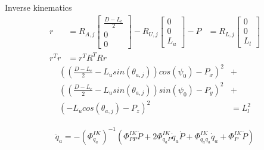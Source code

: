 Inverse kinematics
\begin{equation}
    \begin{aligned}
    r&= R_{A,j}\begin{bmatrix}\frac{D-L_e}{2}\\0\\0 \end{bmatrix} - R_{U,j}\begin{bmatrix}0\\0\\L_u  \end{bmatrix} - P &=
    R_{L,j}\begin{bmatrix}0\\0\\L_l  \end{bmatrix} \\
    r^Tr&=r^TR^TRr &
    \end{aligned}
\end{equation}
\begin{equation}
\begin{aligned}
        \left(\left(\frac{D-L_e}{2}-L_u sin(\theta_{a,j})\right)cos(\psi_0)-P_x\right)^2 &+ \\
        \left(\left(\frac{D-L_e}{2}-L_usin(\theta_{a,j})\right)sin(\psi_0)-P_y\right)^2 &+\\
        (-L_ucos(\theta_{a,j})-P_z)^2 &= L_l^2
\end{aligned}
\end{equation}

\begin{equation}
\begin{aligned}
    \ddot{q}_a=-(\Phi^{IK}_{q_a})^{-1}(\Phi^{IK}_{PP}\dot{P} +2\Phi^{IK}_{q_aP}\dot{q}_a\dot{P} + \Phi^{IK}_{q_a q_a}\dot{q}_a +\Phi^{IK}_{P}\ddot{P} )
\end{aligned}
\end{equation}

